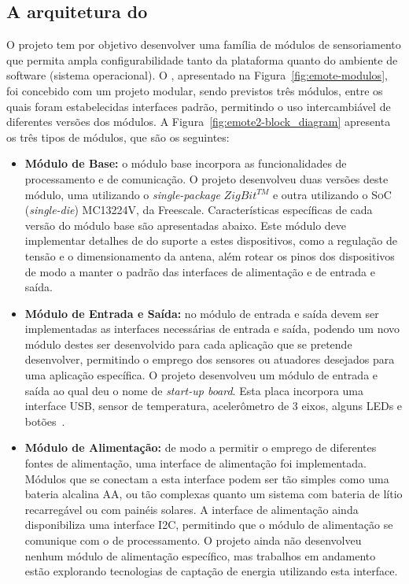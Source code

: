 \subsection{A arquitetura do \emote}
\label{sec:emote_arch}

O projeto \emote tem por objetivo desenvolver uma família de módulos de
sensoriamento que permita ampla configurabilidade tanto da plataforma quanto do
ambiente de software (sistema operacional). O \emote, apresentado na
Figura~\ref{fig:emote-modulos}, foi concebido com um projeto modular, sendo
previstos três módulos, entre os quais foram estabelecidas interfaces padrão,
permitindo o uso intercambiável de diferentes versões dos módulos. A
Figura~\ref{fig:emote2-block_diagram} apresenta os três tipos de módulos, que
são os seguintes:
\begin{itemize}
    \item \textbf{Módulo de Base:} o módulo base incorpora as funcionalidades de
    processamento e de comunicação. O projeto \emote desenvolveu duas versões
    deste módulo, uma utilizando o \emph{single-package} $ZigBit^{TM}$ e outra
    utilizando o \textsc{SoC} (\emph{single-die}) MC13224V, da Freescale.
    Características específicas de cada versão do módulo base são apresentadas
    abaixo. Este módulo deve implementar detalhes de do suporte a estes
    dispositivos, como a regulação de tensão e o dimensionamento da antena, além
    rotear os pinos dos dispositivos de modo a manter o padrão das interfaces de
    alimentação e de entrada e saída.
    \item \textbf{Módulo de Entrada e Saída:} no módulo de entrada e saída devem
    ser implementadas as interfaces necessárias de entrada e saída, podendo um
    novo módulo destes ser desenvolvido para cada aplicação que se pretende
    desenvolver, permitindo o emprego dos sensores ou atuadores desejados para
    uma aplicação específica. O projeto \emote desenvolveu um módulo de entrada
    e saída ao qual deu o nome de \textit{start-up board}. Esta placa incorpora
    uma interface USB, sensor de temperatura, acelerômetro de 3 eixos, alguns
    LEDs e botões~\cite{Project:Emote:2010}.
    \item \textbf{Módulo de Alimentação:} de modo a permitir o emprego de
    diferentes fontes de alimentação, uma interface de alimentação foi
    implementada. Módulos que se conectam a esta interface podem ser tão simples
    como uma bateria alcalina AA, ou tão complexas quanto um sistema com bateria
    de lítio recarregável ou com painéis solares. A interface de alimentação
    ainda disponibiliza uma interface I2C, permitindo que o módulo de
    alimentação se comunique com o de processamento. O projeto \emote ainda não
    desenvolveu nenhum módulo de alimentação específico, mas trabalhos em
    andamento estão explorando tecnologias de captação de energia utilizando
    esta interface.
\end{itemize}

